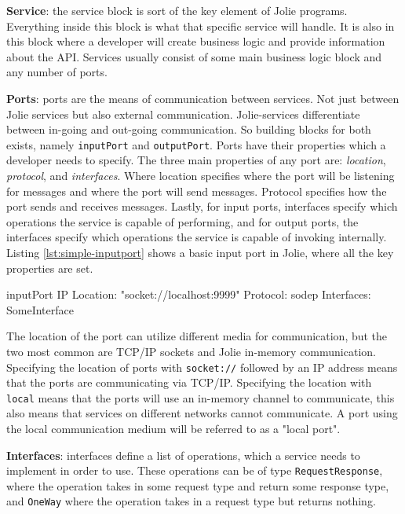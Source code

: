 \textbf{Service}: the service block is sort of the key element of Jolie programs. Everything inside this block is what that specific service will handle. It is also 
in this block where a developer will create business logic and provide information about the API. Services usually consist of some main business logic block and any number of ports.

\textbf{Ports}: ports are the means of communication between services. Not just between Jolie services but also external communication.
Jolie-services differentiate between in-going and out-going communication. So building blocks for both exists, namely \texttt{inputPort} and \texttt{outputPort}.
Ports have their properties which a developer needs to specify. The three main properties of any port are: \textit{location}, \textit{protocol}, and \textit{interfaces}.
Where location specifies where the port will be listening for messages and where the port will send messages.
Protocol specifies how the port sends and receives messages. Lastly, for input ports, interfaces specify which
operations the service is capable of performing, and for output ports, the interfaces specify which
operations the service is capable of invoking internally. Listing \ref*{lst:simple-inputport} shows a basic input port in Jolie, where all the key properties are set.

\begin{jolisting}[][caption={Simple input port in Jolie},label=lst:simple-inputport]
inputPort IP {
    Location: "socket://localhost:9999"
    Protocol: sodep
    Interfaces: SomeInterface
}
\end{jolisting}

The location of the port can utilize different media for communication, but the two most common are TCP/IP sockets and Jolie in-memory communication.
Specifying the location of ports with \texttt{socket://} followed by an IP address means that the ports are communicating via TCP/IP.
Specifying the location with \texttt{local} means that the ports will use an in-memory channel to communicate, this also means that services on different networks cannot communicate.
A port using the local communication medium will be referred to as a "local port".

\textbf{Interfaces}: interfaces define a list of operations, which a service needs to implement in order to use. These operations can be of type \texttt{RequestResponse}, where the operation takes in some request type and return some response type, 
and \texttt{OneWay} where the operation takes in a request type but returns nothing.

